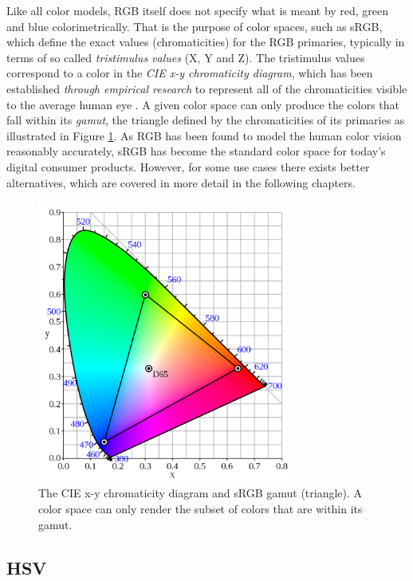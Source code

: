 \documentclass[thesis.tex]{subfiles}
\begin{document}
Like all color models, RGB itself does not specify what is meant by red, green and blue colorimetrically. That is the purpose of color spaces, such as sRGB, which define the exact values (chromaticities) for the RGB primaries, typically in terms of so called \textit{tristimulus values} (X, Y and Z). The tristimulus values correspond to a color in the \textit{CIE x-y chromaticity diagram}, which has been established \emph{through empirical research} to represent all of the chromaticities visible to the average human eye \cite{cie}. A given color space can only produce the colors that fall within its \textit{gamut}, the triangle defined by the chromaticities of its primaries as illustrated in Figure \ref{figure:srgb}. As RGB has been found to model the human color vision reasonably accurately, sRGB has become the standard color space for today's digital consumer products. However, for some use cases there exists better alternatives, which are covered in more detail in the following chapters.

\clearpage
\begin{figure}[ht]
\centering \includegraphics[width=0.75\textwidth]{images/srgb}
\caption{The CIE x-y chromaticity diagram and sRGB gamut (triangle). A color space can only render the subset of colors that are within its gamut.\label{figure:srgb}}
\end{figure}

\subsection{HSV}
\end{document}
